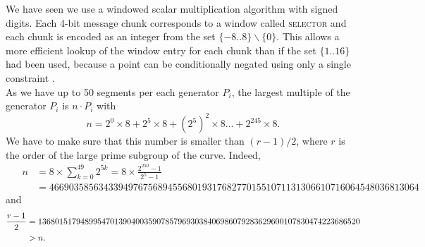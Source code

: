 
We have seen we use a windowed scalar multiplication algorithm with signed digits. Each 4-bit message chunk corresponds to a window called \textsc{selector} and each chunk is encoded as an integer from the set $\{-8..8\}\backslash \{0\}$. 
This allows a more efficient lookup of the window entry for each chunk than if the set $\{1..16\}$ had been used, because a point can be conditionally negated using only a single constraint \cite{sapling}.\\




As we have up to 50 segments per each generator $P_i$, the largest multiple of the generator $P_i$ is $n\cdot P_i$ with 
$$n = 2^0 \times8 + 2^5 \times 8 + \left(2^5\right)^2 \times8 \dots + 	2^{245}\times 8 .$$
We have to make sure that this number is smaller than $(r-1)/2$, where $r$ is the order of the large prime subgroup of the curve.  Indeed,
\begin{align*}
	\quad\; n 
	& = 8 \times \sum_{ k = 0}^{49} 2^{5k}
	= 8 \times \frac{2^{250}-1}{2^5-1}\\
	& = 466903585634339497675689455680193176827701551071131306610716064548036813064%
\end{align*}
\vspace{-0.2cm}
and 
%
\begin{align*}
	\frac{r-1}{2} &= 1368015179489954701390400359078579693038406986079283629600107830474223686520 \\
	& > n.\\ \vspace{0.4cm}
\end{align*}

%